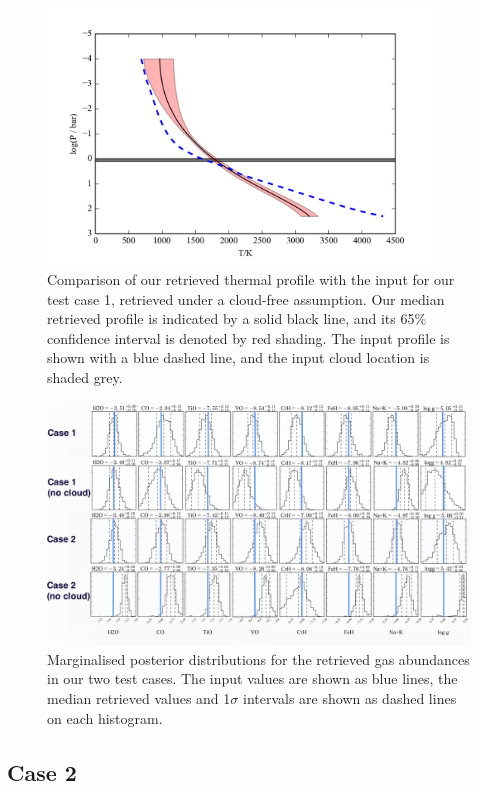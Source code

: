 \documentclass[useAMS,usenatbib]{mn2e}
\begin{document}
\begin{figure}
\hspace{-0.8cm}\includegraphics[width=290pt]{TestBD_Case1_OFF_prof_1sigma.png}
\caption{Comparison of our retrieved thermal profile with the input for our test case 1, retrieved under a cloud-free assumption. Our median retrieved profile is indicated by a solid black line, and its 65\% confidence interval is denoted by red shading. The input profile is shown with a blue dashed line, and the input cloud location is shaded grey. 
\label{fig:test1_nc}}
\end{figure}

\begin{figure}
\hspace{-0.8cm}\includegraphics[width=500pt]{stack_gases_new_thick.png}
\caption{Marginalised posterior distributions for the retrieved gas abundances in our two test cases. The input values are shown as blue lines, the median retrieved values and 1$\sigma$ intervals are shown as dashed lines on each histogram.
\label{fig:gasstack}}
\end{figure}

\subsection{Case 2}
\end{document}

